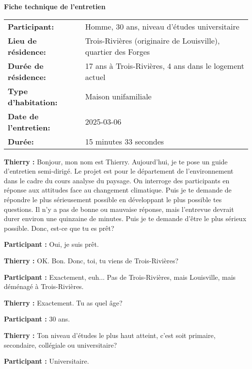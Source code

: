 
\begin{minipage}{\textwidth}
\colorbox{gray!10}{
\begin{minipage}{0.98\textwidth}
\small\textbf{Fiche technique de l'entretien}

\begin{tabular}{ll}
\textbf{Participant:} & Homme, 30 ans, niveau d'études universitaire \\
\textbf{Lieu de résidence:} & Trois-Rivières (originaire de Louisville), quartier des Forges \\
\textbf{Durée de résidence:} & 17 ans à Trois-Rivières, 4 ans dans le logement actuel \\
\textbf{Type d'habitation:} & Maison unifamiliale \\
\textbf{Date de l'entretien:} & 2025-03-06 \\
\textbf{Durée:} & 15 minutes 33 secondes \\
\end{tabular}
\end{minipage}}
\end{minipage}

\vspace{1em}

\textbf{Thierry :} Bonjour, mon nom est Thierry. Aujourd'hui, je te pose un guide d'entretien semi-dirigé. Le projet est pour le département de l'environnement dans le cadre du cours analyse du paysage. On interroge des participants en réponse aux attitudes face au changement climatique. Puis je te demande de répondre le plus sérieusement possible en développant le plus possible tes questions. Il n'y a pas de bonne ou mauvaise réponse, mais l'entrevue devrait durer environ une quinzaine de minutes. Puis je te demande d'être le plus sérieux possible. Donc, est-ce que tu es prêt?

\textbf{Participant :} Oui, je suis prêt.

\textbf{Thierry :} OK. Bon. Donc, toi, tu viens de Trois-Rivières?

\textbf{Participant :} Exactement, euh... Pas de Trois-Rivières, mais Louisville, mais déménagé à Trois-Rivières.

\textbf{Thierry :} Exactement. Tu as quel âge?

\textbf{Participant :} 30 ans.

\textbf{Thierry :} Ton niveau d'études le plus haut atteint, c'est soit primaire, secondaire, collégiale ou universitaire?

\textbf{Participant :} Universitaire.

